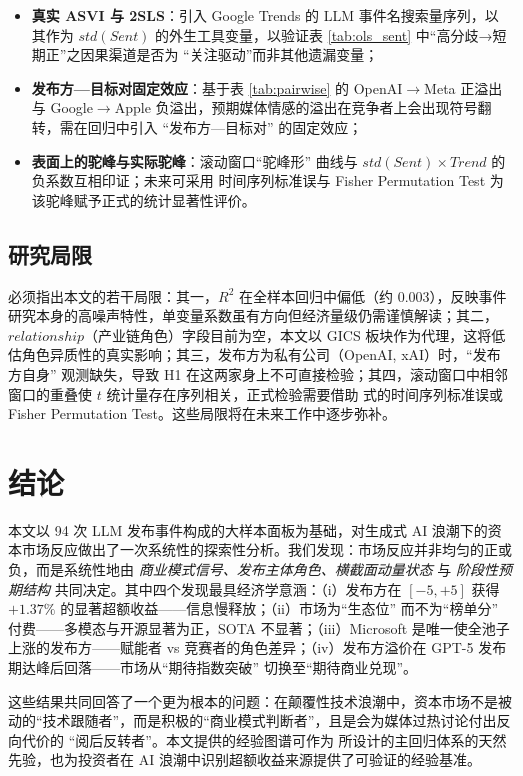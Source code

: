 \documentclass[11pt]{ctexart}
\begin{document}
\begin{itemize}
\item \textbf{真实 ASVI 与 2SLS}：引入 Google Trends 的 LLM 事件名搜索量序列，以其作为 $std(Sent)$ 的外生工具变量，以验证表 \ref{tab:ols_sent} 中“高分歧→短期正”之因果渠道是否为 “关注驱动”而非其他遗漏变量；
\item \textbf{发布方—目标对固定效应}：基于表 \ref{tab:pairwise} 的 OpenAI$\to$Meta 正溢出与 Google$\to$Apple 负溢出，预期媒体情感的溢出在竞争者上会出现符号翻转，需在回归中引入 “发布方—目标对” 的固定效应；
\item \textbf{表面上的驼峰与实际驼峰}：滚动窗口“驼峰形” 曲线与 $std(Sent)\times Trend$ 的负系数互相印证；未来可采用 \cite{NeweyWest1987} 时间序列标准误与 Fisher Permutation Test 为该驼峰赋予正式的统计显著性评价。
\end{itemize}

\subsection{研究局限}

必须指出本文的若干局限：其一，$R^2$ 在全样本回归中偏低（约 0.003），反映事件研究本身的高噪声特性，单变量系数虽有方向但经济量级仍需谨慎解读；其二，$relationship$（产业链角色）字段目前为空，本文以 GICS 板块作为代理，这将低估角色异质性的真实影响；其三，发布方为私有公司（OpenAI, xAI）时，“发布方自身” 观测缺失，导致 H1 在这两家身上不可直接检验；其四，滚动窗口中相邻窗口的重叠使 $t$ 统计量存在序列相关，正式检验需要借助 \cite{NeweyWest1987} 式的时间序列标准误或 Fisher Permutation Test。这些局限将在未来工作中逐步弥补。

\section{结论}

本文以 94 次 LLM 发布事件构成的大样本面板为基础，对生成式 AI 浪潮下的资本市场反应做出了一次系统性的探索性分析。我们发现：市场反应并非均匀的正或负，而是系统性地由 \emph{商业模式信号、发布主体角色、横截面动量状态} 与 \emph{阶段性预期结构} 共同决定。其中四个发现最具经济学意涵：（i）发布方在 $[-5,+5]$ 获得 $+1.37\%$ 的显著超额收益——信息慢释放；（ii）市场为“生态位” 而不为“榜单分” 付费——多模态与开源显著为正，SOTA 不显著；（iii）Microsoft 是唯一使全池子上涨的发布方——赋能者 vs 竞赛者的角色差异；（iv）发布方溢价在 GPT-5 发布期达峰后回落——市场从“期待指数突破” 切换至“期待商业兑现”。

这些结果共同回答了一个更为根本的问题：在颠覆性技术浪潮中，资本市场不是被动的“技术跟随者”，而是积极的“商业模式判断者”，且是会为媒体过热讨论付出反向代价的 “阅后反转者”。本文提供的经验图谱可作为 \cite{proposal} 所设计的主回归体系的天然先验，也为投资者在 AI 浪潮中识别超额收益来源提供了可验证的经验基准。
\end{document}

